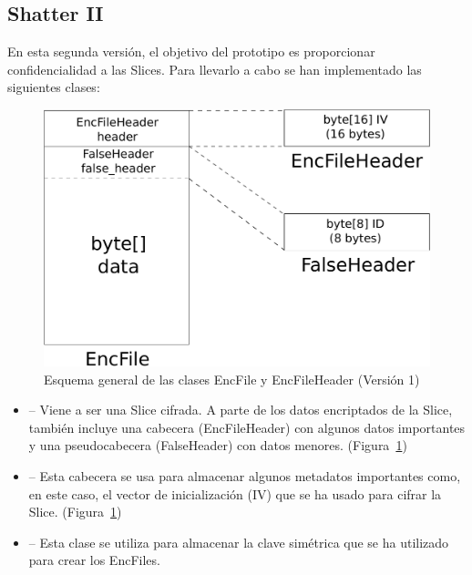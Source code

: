 
\subsection{Shatter II}

En esta segunda versión, el objetivo del prototipo es proporcionar
confidencialidad a las Slices. Para llevarlo a cabo se han implementado las
siguientes clases:

\begin{figure}[!htb]
  \centering
  \includegraphics[scale=0.4]{Figures/EncFile_Header_1}
  \decoRule
  \caption[EncFile - EncFileHeader (Versión 1)]{Esquema general de las clases EncFile y EncFileHeader (Versión 1)}
  \label{fig:EncFile_Header_1}
\end{figure}

\begin{itemize}
  \item {} -- Viene a ser una Slice cifrada. A parte de los datos
  encriptados de la Slice, también incluye una cabecera (EncFileHeader) con
  algunos datos importantes y una pseudocabecera (FalseHeader) con datos menores.
  (Figura~\ref{fig:EncFile_Header_1})

  \item {} -- Esta cabecera se usa para almacenar algunos
  metadatos importantes como, en este caso, el vector de inicialización (IV)
  que se ha usado para cifrar la Slice. (Figura~\ref{fig:EncFile_Header_1})

  \item {} -- Esta clase se utiliza para almacenar la clave
  simétrica que se ha utilizado para crear los EncFiles.
\end{itemize}


